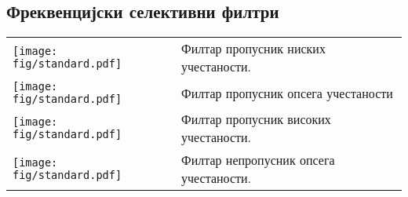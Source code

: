 \subsection*{Фреквенцијски селективни филтри}

\noindent
\begin{tabular}{ll}    
    \begin{minipage}{0.1\textwidth}
        \texttt{[image: fig/standard.pdf]}     
    \end{minipage}
    & 
    \begin{minipage}{0.8\textwidth}
        Филтар пропусник ниских учестаности. 
    \end{minipage}
    \\[5mm]
    \begin{minipage}{0.1\textwidth}
        \texttt{[image: fig/standard.pdf]}     
    \end{minipage}
    & 
    \begin{minipage}{0.8\textwidth}
        Филтар пропусник опсега учестаности
    \end{minipage}
    \\[5mm]
    \begin{minipage}{0.1\textwidth}
        \texttt{[image: fig/standard.pdf]}     
    \end{minipage}
    & 
    \begin{minipage}{0.8\textwidth}
        Филтар пропусник високих учестаности. 
    \end{minipage}
    \\[5mm]
    \begin{minipage}{0.1\textwidth}
        \texttt{[image: fig/standard.pdf]}     
    \end{minipage}
    & 
    \begin{minipage}{0.8\textwidth}
        Филтар непропусник опсега учестаности.
    \end{minipage}
\end{tabular}


